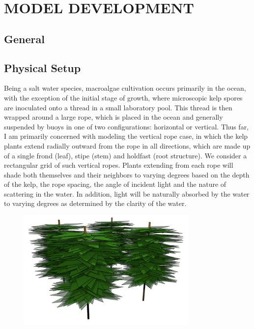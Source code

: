 \chapter{MODEL DEVELOPMENT} \label{label:modeldevelopment}

\graphicspath{{./figures/}}

\section{General}

\section{Physical Setup}
Being a salt water species, macroalgae cultivation occurs primarily in the ocean, with the exception of the initial stage of growth, where microscopic kelp spores are inoculated onto a thread in a small laboratory pool.
This thread is then wrapped around a large rope, which is placed in the ocean and generally suspended by buoys in one of two configurations: horizontal or vertical.
Thus far, I am primarily concerned with modeling the vertical rope case, in which the kelp plants extend radially outward from the rope in all directions, which are made up of a single frond (leaf), stipe (stem) and holdfast (root structure).
We consider a rectangular grid of such vertical ropes. 
Plants extending from each rope will shade both themselves and their neighbors to varying degrees based on the depth of the kelp, the rope spacing, the angle of incident light and the nature of scattering in the water.
In addition, light will be naturally absorbed by the water to varying degrees as determined by the clarity of the water.

\begin{figure}[H]
	\centering
	\includegraphics[width=3.5in]{kelp_array}
\end{figure}
